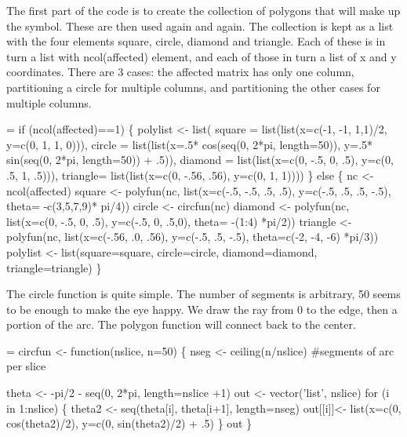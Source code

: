 \documentclass{article}
\begin{document}
The first part of the code is to create the collection of polygons that
will make up the symbol.  These are then used again and again.
The collection is kept as a list with the four elements square, circle,
diamond and triangle.  
Each of these is in turn a list with ncol(affected) element, and each
of those in turn a list of x and y coordinates.
There are 3 cases: the affected matrix has
only one column, partitioning a circle for multiple columns, and 
partitioning the other cases for multiple columns.

\begin{nwchunk}
=
 if (ncol(affected)==1) \{
     polylist <- list(
         square = list(list(x=c(-1, -1, 1,1)/2,  y=c(0, 1, 1, 0))),
         circle = list(list(x=.5* cos(seq(0, 2*pi, length=50)),
                            y=.5* sin(seq(0, 2*pi, length=50)) + .5)),
         diamond = list(list(x=c(0, -.5, 0, .5), y=c(0, .5, 1, .5))),
         triangle= list(list(x=c(0, -.56, .56),  y=c(0, 1, 1))))
     \}
 else \{
     nc <- ncol(affected)
     square <- polyfun(nc, list(x=c(-.5, -.5, .5, .5), y=c(-.5, .5, .5, -.5),
                                 theta= -c(3,5,7,9)* pi/4))
     circle <- circfun(nc)
     diamond <-  polyfun(nc, list(x=c(0, -.5, 0, .5), y=c(-.5, 0, .5,0),
                                 theta= -(1:4) *pi/2))
     triangle <- polyfun(nc, list(x=c(-.56, .0, .56), y=c(-.5, .5, -.5),
                                  theta=c(-2, -4, -6) *pi/3))
     polylist <- list(square=square, circle=circle, diamond=diamond, 
                      triangle=triangle)
     \}
\end{nwchunk}

The circle function is quite simple.  The number of segments is arbitrary,
50 seems to be enough to make the eye happy.  We draw the ray from 0 to
the edge, then a portion of the arc.  The polygon function will connect
back to the center.
\begin{nwchunk}
=
 circfun <- function(nslice, n=50) \{
     nseg <- ceiling(n/nslice)  #segments of arc per slice
     
     theta <- -pi/2 - seq(0, 2*pi, length=nslice +1)
     out <- vector('list', nslice)
     for (i in 1:nslice) \{
         theta2 <- seq(theta[i], theta[i+1], length=nseg)
         out[[i]]<- list(x=c(0, cos(theta2)/2),
                         y=c(0, sin(theta2)/2) + .5)
         \}
     out
     \}
\end{nwchunk}
\end{document}
